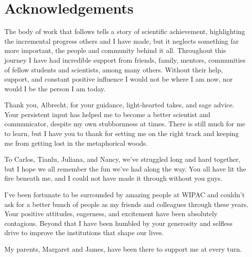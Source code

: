 \documentclass[oneside, letterpaper, 10pt, oldfontcommands]{memoir}
\begin{document}
\frontmatter

\thetitlepage
\cleardoublepage
\setcounter{page}{1}


\section{Acknowledgements}

The body of work that follows tells a story of scientific achievement, highlighting the incremental progress others and I have made, but it neglects something far more important, the people and community behind it all. Throughout this journey I have had incredible support from friends, family, mentors, communities of fellow students and scientists, among many others. Without their help, support, and constant positive influence I would not be where I am now, nor would I be the person I am today.

Thank you, Albrecht, for your guidance, light-hearted takes, and sage advice. Your persistent input has helped me to become a better scientist and communicator, despite my own stubbornness at times. There is still much for me to learn, but I have you to thank for setting me on the right track and keeping me from getting lost in the metaphorical woods.

To Carlos, Tianlu, Juliana, and Nancy, we've struggled long and hard together, but I hope we all remember the fun we've had along the way.
You all have lit the fire beneath me, and I could not have made it through without you guys.

I've been fortunate to be surrounded by amazing people at WIPAC and couldn't ask for a better bunch of people as my friends and colleagues through these years.
Your positive attitudes, eagerness, and excitement have been absolutely contagious.
Beyond that I have been humbled by your generosity and selfless drive to improve the institutions that shape our lives.

My parents, Margaret and James, have been there to support me at every turn.



\clearpage
\tableofcontents\clearpage

\mainmatter










\end{document}
